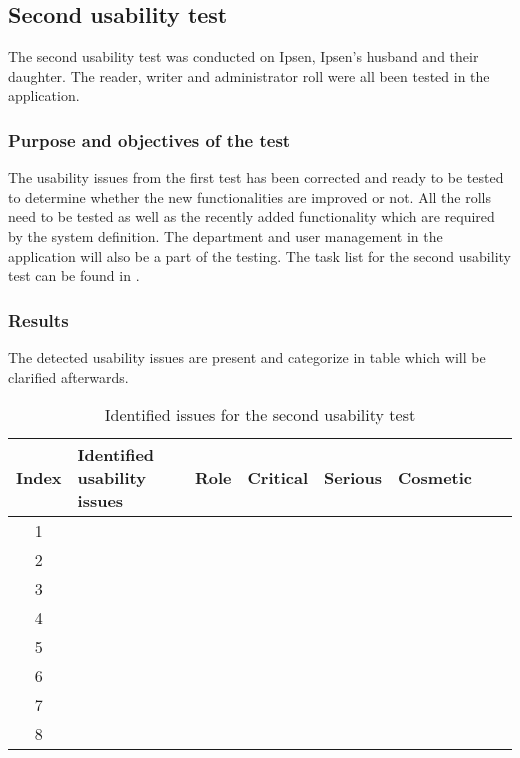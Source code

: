 

\subsection{Second usability test}\label{secondtest}
The second usability test was conducted on Ipsen, Ipsen's husband and their daughter. 
The reader, writer and administrator roll were all been tested in the application.

\subsubsection{Purpose and objectives of the test}
The usability issues from the first test has been corrected and ready to be tested to determine whether the new functionalities are improved or not. 
All the rolls need to be tested as well as the recently added functionality which are required by the system definition. 
The department and user management in the application will also be a part of the testing. The task list for the second usability test can be found in .

\subsubsection{Results}

The detected usability issues are present and categorize in table 
 which will be clarified afterwards. 

\begin{table}[H]
	\begin{center}
	\begin{tabular}{| c | m{19em} | c | c | c | c | c | c |}
		\hline
		Index & \textbf{Identified usability issues} & Role & Critical & Serious & Cosmetic \\
		\hline
		 1 &  & & & &  \\
		\hline
		 2 & & & & & \\
		\hline
		 3 & & & & & \\
		\hline
		4 & &  & & &\\
		\hline
		5 & &  &  &  &\\
		\hline
		6 & &  &  & &\\
		\hline
		7 &  & & &  &\\
		\hline
		8 &  &  &  & & \\
		\hline
	\end{tabular}
	\end{center}
	\caption{Identified issues for the second usability test}\label{tab:utest2}
\end{table}

